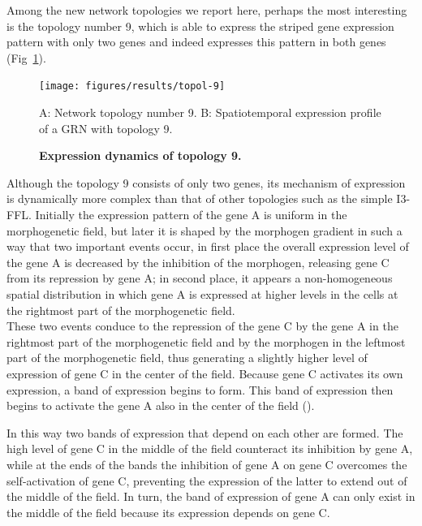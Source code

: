 \documentclass[10pt,letterpaper]{article}
\begin{document}
Among the new network topologies we report here, perhaps the most interesting
is the topology number 9, which is able to express the striped gene expression
pattern with only two genes and indeed expresses this pattern in both genes
(Fig~\ref{fig:topol9}).

\begin{figure}[!h]
 \texttt{[image: figures/results/topol-9]}
 \caption{\bf Expression dynamics of topology 9.}
 A: Network topology number 9. B: Spatiotemporal expression profile of a GRN
 with topology 9.
 \label{fig:topol9}
\end{figure}

Although the topology 9 consists of only two genes, its mechanism of expression
is dynamically more complex than that of other topologies such as the simple
I3-FFL. Initially the expression pattern of the gene A is uniform in the
morphogenetic field, but later it is shaped by the morphogen gradient in such a
way that two important events occur, in first place the overall expression
level of the gene A is decreased by the inhibition of the morphogen, releasing
gene C from its repression by gene A; in second place, it appears a 
non-homogeneous spatial distribution in which gene A is expressed at higher 
levels in the cells at the rightmost part of the morphogenetic field.\\

These two events conduce to the repression of the gene C by the gene A in the
rightmost part of the morphogenetic field and by the morphogen in the leftmost
part of the morphogenetic field, thus generating a slightly higher level of
expression of gene C in the center of the field. Because gene C activates its
own expression, a band of expression begins to form. This band of expression
then begins to activate the gene A also in the center of the field
().


In this way two bands of expression that depend on each other are formed. The
high level of gene C in the middle of the field counteract its inhibition by
gene A, while at the ends of the bands the inhibition of gene A on gene C
overcomes the self-activation of gene C, preventing the expression of the
latter to extend out of the middle of the field. In turn, the band of
expression of gene A can only exist in the middle of the field because its
expression depends on gene C.
\end{document}

